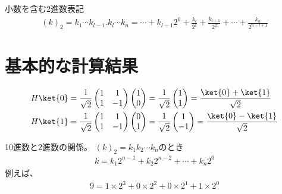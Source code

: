 \documentclass[]{ltjsarticle}
\begin{document}
小数を含む2進数表記
\begin{align}
    (k)_2 
    =
    k_1 \cdots k_{l-1}. k_l \cdots k_n
    =
    \cdots + k_{l-1} 2^{0}
    +
    \frac{k_l}{2^1}
    +
    \frac{k_{l+1}}{2^2}
    +
    \cdots
    +
    \frac{k_n}{2^{n-l+1}}
\end{align}


\section{基本的な計算結果}
\begin{align}
    H \ket{0}
    &=
    \frac{1}{\sqrt{2}}
    \begin{pmatrix}
        1 & 1 \\
        1 & -1
    \end{pmatrix}
    \begin{pmatrix}
        1 \\ 0
    \end{pmatrix}
    =
    \frac{1}{\sqrt{2}}
    \begin{pmatrix}
        1 \\ 1
    \end{pmatrix}
    =
    \frac{\ket{0} + \ket{1}}{\sqrt{2}} \\
    H \ket{1}
    &=
    \frac{1}{\sqrt{2}}
    \begin{pmatrix}
        1 & 1 \\
        1 & -1
    \end{pmatrix}
    \begin{pmatrix}
        0 \\ 1
    \end{pmatrix}
    =
    \frac{1}{\sqrt{2}}
    \begin{pmatrix}
        1 \\ -1
    \end{pmatrix}
    =
    \frac{\ket{0} - \ket{1}}{\sqrt{2}}
\end{align}

10進数と2進数の関係。
$(k)_2 = k_1 k_2 \cdots k_n$のとき
\begin{align}
    k 
    = 
    k_1 2^{n-1}
    +
    k_2 2^{n-2}
    +
    \cdots
    +
    k_n 2^0
\end{align}
例えば、
\begin{align}
    9 
    = 
    1 \times 2^{3}
    +
    0 \times 2^{2}
    +
    0 \times 2^{1}
    +
    1 \times 2^0
\end{align}


\end{document}
